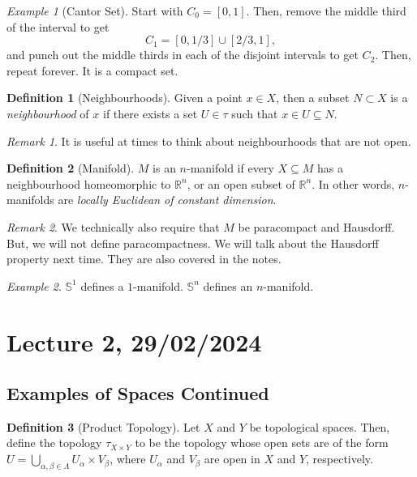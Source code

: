 \documentclass[a4paper]{report}
\theoremstyle{definition}
\newtheorem{definition}{Definition}
\theoremstyle{remark}
\newtheorem{remark}{Remark}
\theoremstyle{proposition}
\theoremstyle{conjecture}
\theoremstyle{lemma}
\theoremstyle{corollary}
\theoremstyle{exercise}
\newtheorem{example}{Example}
\begin{document}
\begin{example}[Cantor Set]
    Start with $C_0 = [0,1]$. Then, remove the middle third of the interval
    to get $$C_1 = [0,1/3]\cup [2/3,1],$$
    and punch out the middle thirds in each of the disjoint intervals to get 
    $C_2$. Then, repeat forever. It is a compact set.
\end{example}

\begin{definition}[Neighbourhoods]
    Given a point $x\in X$, then a subset $N\subset X$ is a 
    \emph{neighbourhood} of $x$ if there exists a set $U \in\tau$
    such that $x \in U \subseteq N$.
\end{definition}

\begin{remark}
    It is useful at times to think about neighbourhoods that are not open.
\end{remark}

\begin{definition}[Manifold]
    $M$ is an $n$-manifold if every $X\subseteq M$ has a neighbourhood 
    homeomorphic to $\mathbb{R}^n$, or an open subset of $\mathbb{R}^n$.
    In other words, $n$-manifolds are \emph{locally Euclidean of constant
    dimension}. 
\end{definition}

\begin{remark}
    We technically also require that $M$ be paracompact and Hausdorff.
    But, we will not define paracompactness. We will talk about 
    the Hausdorff property next time. They are also covered in the notes.
\end{remark}

\begin{example}
    $\mathbb{S}^1$ defines a $1$-manifold. $\mathbb{S}^n$ defines an
    $n$-manifold.
\end{example}

\section{Lecture 2, 29/02/2024}

\subsection{Examples of Spaces Continued}

\begin{definition}[Product Topology]
    Let $X$ and $Y$ be topological spaces. Then, define the 
    topology $\tau_{X\times Y}$ to be the topology whose open sets 
    are of the form $U = \bigcup_{\alpha,\beta \in \Lambda} U_\alpha \times V_\beta$,
    where $U_\alpha$ and $V_\beta$ are open in $X$ and $Y$, respectively.
\end{definition}
\end{document}

